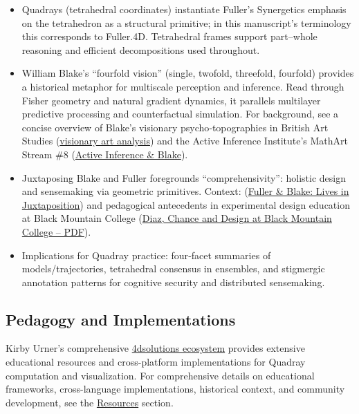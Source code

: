 \documentclass[
  10pt,
]{article}
\providecommand{\tightlist}{%
  \setlength{\itemsep}{0pt}\setlength{\parskip}{0pt}}
\begin{document}
\begin{itemize}
\tightlist
\item
  Quadrays (tetrahedral coordinates) instantiate Fuller's Synergetics
  emphasis on the tetrahedron as a structural primitive; in this
  manuscript's terminology this corresponds to Fuller.4D. Tetrahedral
  frames support part--whole reasoning and efficient decompositions used
  throughout.
\item
  William Blake's ``fourfold vision'' (single, twofold, threefold,
  fourfold) provides a historical metaphor for multiscale perception and
  inference. Read through Fisher geometry and natural gradient dynamics,
  it parallels multilayer predictive processing and counterfactual
  simulation. For background, see a concise overview of Blake's
  visionary psycho‑topographies in British Art Studies
  (\href{https://www.britishartstudies.ac.uk/index/article-index/visionary-sense-of-london/article-category/cover-collaboration}{visionary
  art analysis}) and the Active Inference Institute's MathArt Stream \#8
  (\href{https://zenodo.org/records/13711302}{Active Inference \&
  Blake}).
\item
  Juxtaposing Blake and Fuller foregrounds ``comprehensivity'': holistic
  design and sensemaking via geometric primitives. Context:
  (\href{https://zenodo.org/records/7519132}{Fuller \& Blake: Lives in
  Juxtaposition}) and pedagogical antecedents in experimental design
  education at Black Mountain College
  (\href{https://commons.princeton.edu/eng574-s23/wp-content/uploads/sites/348/2023/03/Diaz-The-Experimenters-Chance-and-Design-at-Black-Mountain-College.pdf}{Diaz,
  Chance and Design at Black Mountain College -- PDF}).
\item
  Implications for Quadray practice: four‑facet summaries of
  models/trajectories, tetrahedral consensus in ensembles, and
  stigmergic annotation patterns for cognitive security and distributed
  sensemaking.
\end{itemize}

\hypertarget{pedagogy-and-implementations}{%
\subsection{Pedagogy and
Implementations}\label{pedagogy-and-implementations}}

Kirby Urner's comprehensive
\href{https://github.com/4dsolutions}{4dsolutions ecosystem} provides
extensive educational resources and cross-platform implementations for
Quadray computation and visualization. For comprehensive details on
educational frameworks, cross-language implementations, historical
context, and community development, see the
\href{07_resources.md}{Resources} section.
\end{document}
